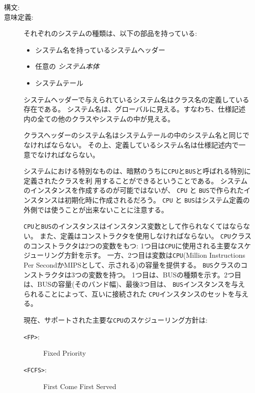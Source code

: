 \documentclass[\pformat,12pt]{jarticle}
\begin{document}
\begin{description}
\item[構文:] 

\item[意味定義:] それぞれのシステムの種類は、以下の部品を持っている:
\begin{itemize}
\item システム名を持っているシステムヘッダー
\item 任意の {\em システム本体}
\item システムテール
\end{itemize}

システムヘッダーで与えられているシステム名はクラス名の定義している存在である。
システム名は、グローバルに見える。すなわち、仕様記述内の全ての他のクラスやシステムの中が見える。

クラスヘッダーのシステム名はシステムテールの中のシステム名と同じでなければならない。
その上、定義しているシステム名は仕様記述内で一意でなければならない。

システムにおける特別なものは、暗黙のうちに\texttt{CPU}と\texttt{BUS}と呼ばれる特別に定義されたクラスを利
用することができるということである。
システムのインスタンスを作成するのが可能ではないが、 \texttt{CPU} と \texttt{BUS}で作られたインスタンスは初期化時に作成されるだろう。
 \texttt{CPU} と \texttt{BUS}はシステム定義の外側では使うことが出来ないことに注意する。

\texttt{CPU}と\texttt{BUS}のインスタンスはインスタンス変数として作られなくてはならない。
また、定義はコンストラクタを使用しなければならない。
\texttt{CPU}クラスのコンストラクタは2つの変数をもつ:
1つ目は\texttt{CPU}に使用される主要なスケジューリング方針を示す。
一方、2つ目は変数は\texttt{CPU}(Million Instructions Per SecondかMIPSとして、示される)の容量を提供する。
\texttt{BUS}クラスのコンストラクタは3つの変数を持つ。
1つ目は、BUSの種類を示す。2つ目は、BUSの容量(そのバンド幅)、最後3つ目は、
\texttt{BUS}インスタンスを与えられることによって、互いに接続された \texttt{CPU}インスタンスのセットを与える。

現在、サポートされた主要な\texttt{CPU}のスケジューリング方針は:
\begin{description}
\item[\texttt{<FP>}:] Fixed Priority
\item[\texttt{<FCFS>}:] First Come First Served
\end{description} 


\end{description}
\end{document}

